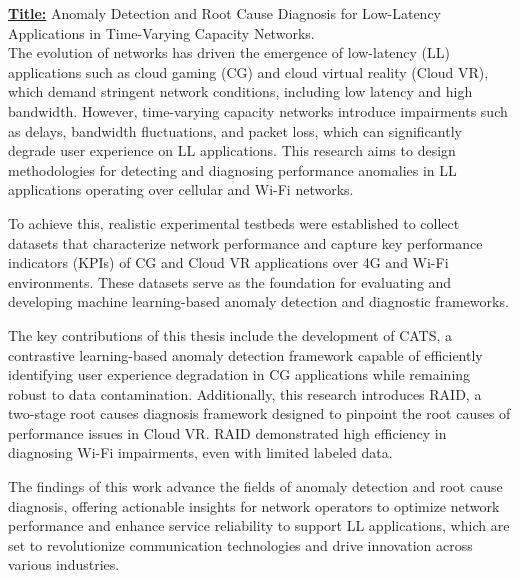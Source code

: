 \documentclass[11pt, nofrench]{thesul}
\theoremstyle{definition}
\begin{document}
\begin{ThesisAbstract}
    \newpage
    
\begin{EnglishAbstract}

\begin{mdframed}
    \textbf{\underline{Title:}} Anomaly Detection and Root Cause Diagnosis for Low-Latency Applications in Time-Varying Capacity Networks. \\
    
        The evolution of networks has driven the emergence of low-latency (LL) applications such as cloud gaming (CG) and cloud virtual reality (Cloud VR), which demand stringent network conditions, including low latency and high bandwidth. However, time-varying capacity networks introduce impairments such as delays, bandwidth fluctuations, and packet loss, which can significantly degrade user experience on LL applications. This research aims to design methodologies for detecting and diagnosing performance anomalies in LL applications operating over cellular and Wi-Fi networks.

        To achieve this, realistic experimental testbeds were established to collect datasets that characterize network performance and capture key performance indicators (KPIs) of CG and Cloud VR applications over 4G and Wi-Fi environments. These datasets serve as the foundation for evaluating and developing machine learning-based anomaly detection and diagnostic frameworks.

        The key contributions of this thesis include the development of CATS, a contrastive learning-based anomaly detection framework capable of efficiently identifying user experience degradation in CG applications while remaining robust to data contamination. Additionally, this research introduces RAID, a two-stage root causes diagnosis framework designed to pinpoint the root causes of performance issues in Cloud VR. RAID demonstrated high efficiency in diagnosing Wi-Fi impairments, even with limited labeled data.

        The findings of this work advance the fields of anomaly detection and root cause diagnosis, offering actionable insights for network operators to optimize network performance and enhance service reliability to support LL applications, which are set to revolutionize communication technologies and drive innovation across various industries.
\end{mdframed}
\end{EnglishAbstract}
    

\end{ThesisAbstract}
\end{document}
